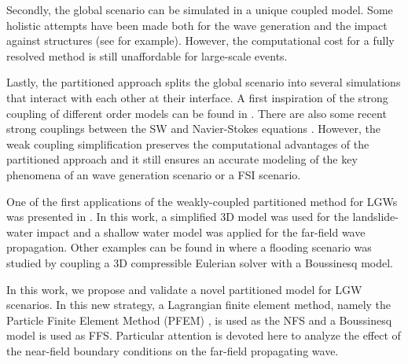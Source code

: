 Secondly, the global scenario can be simulated in a unique coupled model. Some holistic attempts have been made both for the wave generation and the impact against structures (see \cite{CrostaVajont,franci20203dA,zhu2018} for example). However, the computational cost for a fully resolved method is still unaffordable for large-scale events.

Lastly, the partitioned approach splits the global scenario into several simulations that interact with each other at their interface. A first inspiration of the strong coupling of different order models can be found in \cite{formaggia2001}. There are also some recent strong couplings between the SW and Navier-Stokes equations \cite{pringle2016}. However, the weak coupling simplification preserves the computational advantages of the partitioned approach and it still ensures an accurate modeling of the key phenomena of an wave generation scenario or a FSI scenario.

One of the first applications of the weakly-coupled partitioned method for LGWs was presented in \cite{heinrich1998simulation}. In this work, a simplified 3D model was used for the landslide-water impact and a shallow water model was applied for the far-field wave propagation. Other examples can be found in \cite{lovholt2008oceanic} where a flooding scenario was studied by coupling a 3D compressible Eulerian solver with a Boussinesq model.

In this work, we propose and validate a novel partitioned model for LGW scenarios. In this new strategy, a Lagrangian finite element method, namely the Particle Finite Element Method (PFEM) \cite{idelsohn2004, onate2004, cremonesi2020state}, is used as the NFS and a Boussinesq model is used as FFS. Particular attention is devoted here to analyze the effect of the near-field boundary conditions on the far-field propagating wave.


